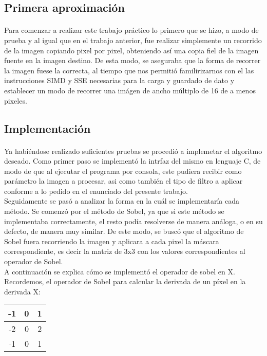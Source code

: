 \documentclass[11pt, a4paper]{article}
\begin{document}
\subsection{Primera aproximaci\'on}
\paragraph{}
Para comenzar a realizar este trabajo pr\'actico lo primero que se hizo, a modo de prueba y al igual que en el trabajo anterior, fue realizar simplemente un recorrido de la imagen copiando pixel por pixel, obteniendo as\'i una copia fiel de la imagen fuente en la imagen destino. De esta modo, se aseguraba que la forma de recorrer la imagen fuese la correcta, al tiempo que nos permiti\'o familirizarnos con el las instrucciones SIMD y SSE necesarias para la carga y guardado de dato y establecer un modo de recorrer una im\'agen de ancho m\'ultiplo de 16 de a menos pixeles.

\subsection{Implementaci\'on}
\paragraph*{}
Ya habi\'endose realizado suficientes pruebas se procedi\'o a implemetar el algoritmo deseado. Como primer paso se implement\'o la intrfaz del mismo en lenguaje C, de modo de que al ejecutar el programa por consola, este pudiera recibir como par\'ametro la imagen a procesar, asi como tambi\'en el tipo de filtro a aplicar conforme a lo pedido en el enunciado del presente trabajo.\\

Seguidamente se pas\'o a analizar la forma en la cu\'al se implementar\'ia cada m\'etodo. Se comenz\'o por el m\'etodo de Sobel, ya que si este m\'etodo se implementaba correctamente, el resto pod\'ia resolverse de manera an\'aloga, o en su defecto, de manera muy similar.
De este modo, se busc\'o que el algoritmo de Sobel fuera recorriendo la imagen y aplicara a cada pixel la m\'ascara correspondiente, es decir la matriz de 3x3 con los valores correspondientes al operador de Sobel.\\
A continuaci\'on se explica c\'omo se implement\'o el operador de sobel en X. Recordemos, el operador de Sobel para calcular la derivada de un p\'ixel en la derivada  X:\\

\begin{table}[h]
\centering
\begin{tabular}{|c|c|c|}
\hline -1 & 0 & 1 \\ 
\hline -2 & 0 & 2 \\ 
\hline -1 & 0 & 1 \\ 
\hline 
\end{tabular}
\end{table}
\end{document}
